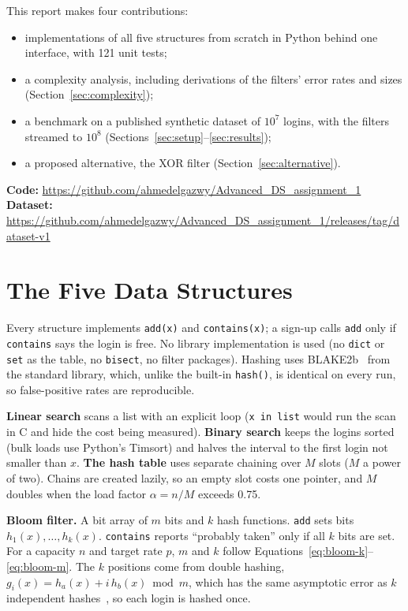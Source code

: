 \documentclass[acmsmall,nonacm]{acmart}
\newcommand{\code}[1]{\texttt{#1}}
\begin{document}
This report makes four contributions:
\begin{itemize}
  \item implementations of all five structures from scratch in Python behind one interface, with 121 unit tests;
  \item a complexity analysis, including derivations of the filters' error rates and sizes (Section~\ref{sec:complexity});
  \item a benchmark on a published synthetic dataset of $10^7$ logins, with the filters streamed to $10^8$ (Sections~\ref{sec:setup}--\ref{sec:results});
  \item a proposed alternative, the XOR filter (Section~\ref{sec:alternative}).
\end{itemize}

\noindent\textbf{Code:} \url{https://github.com/ahmedelgazwy/Advanced_DS_assignment_1}\\
\textbf{Dataset:} \url{https://github.com/ahmedelgazwy/Advanced_DS_assignment_1/releases/tag/dataset-v1}

\section{The Five Data Structures}
\label{sec:structures}

Every structure implements \code{add(x)} and \code{contains(x)}; a sign-up
calls \code{add} only if \code{contains} says the login is free. No library
implementation is used (no \code{dict} or \code{set} as the table, no
\code{bisect}, no filter packages). Hashing uses BLAKE2b~\cite{aumasson2013} from
the standard library, which, unlike the built-in \code{hash()}, is identical on
every run, so false-positive rates are reproducible.

\textbf{Linear search} scans a list with an explicit loop (\code{x in list}
would run the scan in C and hide the cost being measured). \textbf{Binary
search} keeps the logins sorted (bulk loads use Python's Timsort) and halves the
interval to the first login not smaller than $x$. \textbf{The hash table} uses
separate chaining over $M$ slots ($M$ a power of two). Chains are created
lazily, so an empty slot costs one pointer, and $M$ doubles when the load factor
$\alpha = n/M$ exceeds 0.75.

\textbf{Bloom filter.} A bit array of $m$ bits and $k$ hash functions.
\code{add} sets bits $h_1(x), \dots, h_k(x)$. \code{contains} reports
``probably taken'' only if all $k$ bits are set. For a capacity $n$ and target
rate $p$, $m$ and $k$ follow Equations~\eqref{eq:bloom-k}--\eqref{eq:bloom-m}.
The $k$ positions come from double hashing,
$g_i(x) = h_a(x) + i\,h_b(x) \bmod m$, which has the same asymptotic error as
$k$ independent hashes~\cite{kirsch2006}, so each login is hashed once.
\end{document}
